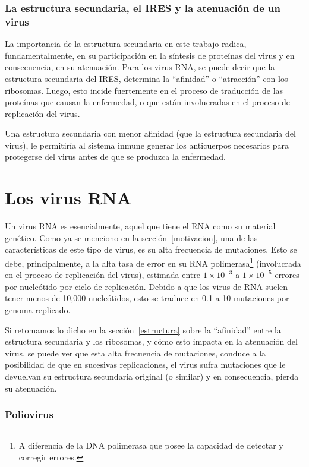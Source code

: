 \subsubsection{La estructura secundaria, el \ac{IRES} y la atenuaci\'on de un
virus}

La importancia de la estructura secundaria en este trabajo radica,
fundamentalmente, en su participaci\'on en la s\'intesis de prote\'inas del
virus y en consecuencia, en su atenuaci\'on. Para los virus \ac{RNA}, se puede
decir que la estructura secundaria del \ac{IRES}, determina la ``afinidad'' o
``atracci\'on'' con los ribosomas. Luego, esto incide fuertemente en el proceso
de traducci\'on de las prote\'inas que causan la enfermedad, o que est\'an
involucradas en el proceso de replicaci\'on del virus. 

Una estructura secundaria con menor afinidad (que la estructura secundaria del
virus), le permitir\'ia al sistema inmune generar los anticuerpos necesarios
para protegerse del virus antes de que se produzca la enfermedad.

\section{Los virus \ac{RNA}}
\label{virus}
Un virus \ac{RNA} es esencialmente, aquel que tiene el \ac{RNA} como su
material gen\'etico. Como ya se menciono en la secci\'on~\ref{motivacion}, una
de las caracter\'isticas de este tipo de virus, es su alta frecuencia de
mutaciones. Esto se debe, principalmente, a la alta tasa de error en su \ac{RNA}
polimerasa\footnote{A diferencia de la \ac{DNA} polimerasa que posee la
capacidad de detectar y corregir errores.} (involucrada en el proceso de
replicaci\'on del virus), estimada entre $1\times10^{-3}$ a $1\times10^{-5}$
errores por nucle\'otido por ciclo de replicaci\'on\cite{Vignuzzi08}. Debido a
que los virus de \ac{RNA} suelen tener menos de 10,000 nucle\'otidos,  esto se
traduce en 0.1 a 10 mutaciones por genoma replicado.

Si retomamos lo dicho en la secci\'on~\ref{estructura} sobre la ``afinidad''
entre la estructura secundaria y los ribosomas, y c\'omo esto impacta en la
atenuaci\'on del virus, se puede ver que esta alta frecuencia de mutaciones,
conduce a la posibilidad de que en sucesivas replicaciones, el virus sufra
mutaciones que le devuelvan su estructura secundaria original (o similar) y en
consecuencia, pierda su atenuaci\'on.

\subsubsection{Poliovirus}

